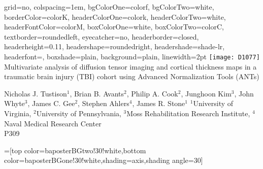 \documentclass[paperwidth=48in,paperheight=48in,portrait,final]{baposter}
\begin{document}
\newlength{\leftimgwidth}
\begin{poster}%
  {
  grid=no,
  colspacing=1em,
  bgColorOne=colorf,
  bgColorTwo=white,
  borderColor=colorK,
  headerColorOne=colork,
  headerColorTwo=white,
  headerFontColor=colorM,
  boxColorOne=white,
  boxColorTwo=colorC,
  textborder=roundedleft,
  eyecatcher=no,
  headerborder=closed,
  headerheight=0.11\textheight,
  headershape=roundedright,
  headershade=shade-lr,
  headerfont=\Large, %
  boxshade=plain,
  background=plain,
  linewidth=2pt
  }
  {\texttt{[image: D1077]}} %
  { %
  Multivariate analysis of diffusion tensor imaging and cortical thickness maps in a traumatic brain injury (TBI) cohort using Advanced Normalization Tools (ANTs)
  \vspace{0.1em}}
  { %
  Nicholas J. Tustison$^1$, Brian B. Avants$^2$, Philip A. Cook$^2$, Junghoon Kim$^3$, John Whyte$^3$, James C. Gee$^2$, Stephen  Ahlers$^4$, James R. Stone$^1$ \newline
  {\normalsize $^1$University of Virginia, $^2$University of Pennsylvania, $^3$Moss Rehabilitation Research Institute, $^4$Naval Medical Research Center \\
  P309
  }
  
  }
  {%
  }

  =[top color=baposterBGtwo!30!white,bottom color=baposterBGone!30!white,shading=axis,shading angle=30]

     \setlength{\leftimgwidth}{0.78em+8.0em}

    \newcommand{\colouredcircle}[1]{%
      \tikz{\useasboundingbox (-0.2em,-0.32em) rectangle(0.2em,0.32em); \draw[draw=black,fill=baposterBGone!80!black!#1!white,line width=0.03em] (0,0) circle(0.18em);}}


\end{poster}
\end{document}
